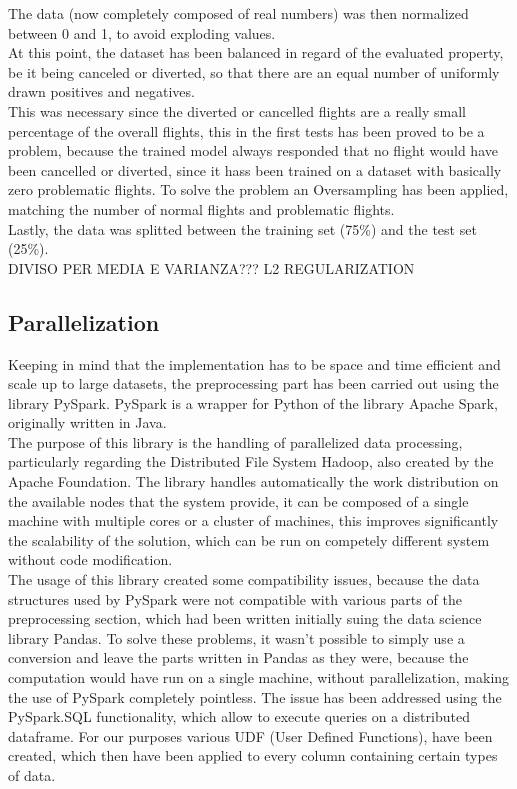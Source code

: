 \documentclass[
	letterpaper, %
	10pt, %
]{class}
\begin{document}
The data (now completely composed of real numbers) was then normalized between 0 and 1, to avoid exploding values.\\

At this point, the dataset has been balanced in regard of the evaluated property, be it being canceled or diverted, so that there are an equal number of uniformly drawn positives and negatives.\\

This was necessary since the diverted or cancelled flights are a really small percentage of the overall flights,
this in the first tests has been proved to be a problem, because the trained model always responded that no flight would have been cancelled or diverted, since it hass been trained on a dataset with basically zero problematic flights.
To solve the problem an Oversampling has been applied, matching the number of normal flights and problematic flights.\\

Lastly, the data was splitted between the training set (75\%) and the test set (25\%).\\

DIVISO PER MEDIA E VARIANZA??? L2 REGULARIZATION

\subsection{Parallelization}

Keeping in mind that the implementation has to be space and time efficient and scale up to large datasets, the preprocessing part has been carried out using the library PySpark.
PySpark is a wrapper for Python of the library Apache Spark, originally written in Java.\\

The purpose of this library is the handling of parallelized data processing, particularly regarding the Distributed File System Hadoop, also created by the Apache Foundation.
The library handles automatically the work distribution on the available nodes that the system provide, it can be composed of a single machine with multiple cores or a cluster of machines, this improves significantly the scalability of the solution, which can be run on competely different system without code modification.\\

The usage of this library created some compatibility issues, because the data structures used by PySpark were not compatible with various parts of the preprocessing section, which had been written initially suing the data science library Pandas.
To solve these problems, it wasn't possible to simply use a conversion and leave the parts written in Pandas as they were, because the computation would have run on a single machine, without parallelization, making the use of PySpark completely pointless.
The issue has been addressed using the PySpark.SQL functionality, which allow to execute queries on a distributed dataframe. For our purposes various UDF (User Defined Functions), have been created, which then have been applied to every column containing certain types of data.\\
\end{document}

